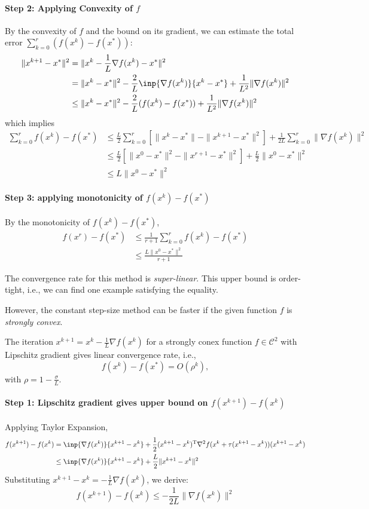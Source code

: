 \paragraph{Step 2: Applying Convexity of $f$}
By the convexity of $f$ and the bound on its gradient, we can estimate the total error $\sum_{k=0}^r(f(x^k) - f(x^*))$:
\begin{align*}
\|x^{k+1} - x^*\|^2&=\|x^k-\frac{1}{L}\nabla f(x^k) - x^*\|^2\\
&=\|x^k-x^*\|^2-\frac{2}{L}\inp{\nabla f(x^k)}{x^k-x^*}+\frac{1}{L^2}\|\nabla f(x^k)\|^2\\
&\le \|x^k-x^*\|^2-\frac{2}{L}(f(x^k) - f(x^*))+\frac{1}{L^2}\|\nabla f(x^k)\|^2
\end{align*}
which implies
\begin{align*}
\sum_{k=0}^r f(x^k) - f(x^*)&\le \frac{L}{2}\sum_{k=0}^r
\left[
\|x^k-x^*\|-\|x^{k+1} - x^*\|^2\right]
+\frac{1}{2L}\sum_{k=0}^r\|\nabla f(x^k)\|^2\\
&\le  \frac{L}{2}\left[\|x^0-x^*\|^2-\|x^{r+1} - x^*\|^2\right]+\frac{L}{2}\|x^0-x^*\|^2\\&\le L\|x^0-x^*\|^2
\end{align*}
\paragraph{Step 3: applying monotonicity of $f(x^k) - f(x^*)$}
By the monotonicity of $f(x^k) - f(x^*)$,
\begin{align*}
f(x^r) - f(x^*)&\le\frac{1}{r+1}\sum_{k=0}^r f(x^k) - f(x^*)\\
&\le\frac{L\|x^0-x^*\|^2}{r+1}
\end{align*}
\begin{remark}
The convergence rate for this method is \emph{super-linear}. 
This upper bound is order-tight, i.e., we can find one example satisfying the equality.
\end{remark}
However, the constant step-size method can be faster if the given function $f$ is \emph{strongly convex}.



\begin{proposition}
The iteration $x^{k+1} = x^k-\frac{1}{L}\nabla f(x^k)$ for a strongly conex function $f\in\mathcal{C}^2$ with Lipschitz gradient gives linear convergence rate, i.e.,
\[
f(x^k) - f(x^*)=O(\rho^k), 
\]
with $\rho = 1-\frac{\sigma}{L}$.
\end{proposition}
\paragraph{Step 1: Lipschitz gradient gives upper bound on $f(x^{k+1}) - f(x^k)$}
Applying Taylor Expansion,
\begin{align*}
f(x^{k+1}) - f(x^k)&= \inp{\nabla f(x^k)}{x^{k+1}-x^k}+\frac{1}{2}(x^{k+1}-x^k)\trans\nabla^2f(x^k+\tau(x^{k+1}-x^k))(x^{k+1}-x^k)\\
&\le
\inp{\nabla f(x^k)}{x^{k+1}-x^k}+
\frac{L}{2}\|x^{k+1}-x^k\|^2
\end{align*}
Substituting $x^{k+1} -x^k=-\frac{1}{L}\nabla f(x^k)$, we derive:
\[
f(x^{k+1}) - f(x^k)\le-\frac{1}{2L}\|\nabla f(x^k)\|^2
\]
